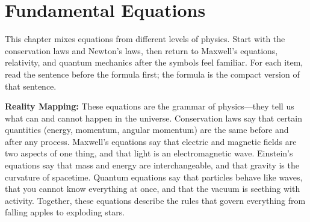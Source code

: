 \chapter{Fundamental Equations}

This chapter mixes equations from different levels of physics. Start with the conservation laws and Newton's laws, then return to Maxwell's equations, relativity, and quantum mechanics after the symbols feel familiar. For each item, read the sentence before the formula first; the formula is the compact version of that sentence.

\textbf{Reality Mapping:} These equations are the grammar of physics---they tell us what can and cannot happen in the universe. Conservation laws say that certain quantities (energy, momentum, angular momentum) are the same before and after any process. Maxwell's equations say that electric and magnetic fields are two aspects of one thing, and that light is an electromagnetic wave. Einstein's equations say that mass and energy are interchangeable, and that gravity is the curvature of spacetime. Quantum equations say that particles behave like waves, that you cannot know everything at once, and that the vacuum is seething with activity. Together, these equations describe the rules that govern everything from falling apples to exploding stars.

